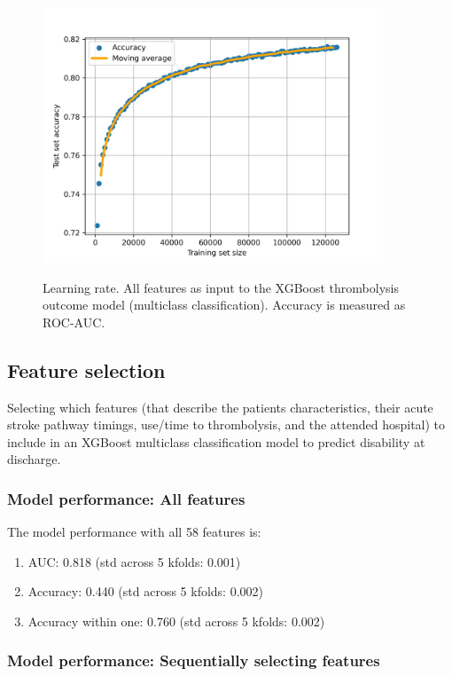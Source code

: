 \begin{figure}[h!]
    \centering
    {\includegraphics[width = 4in]{./images/015_xgb_all_features_learning_curve_learning_curve.jpg}}\\
    \caption{Learning rate. All features as input to the XGBoost thrombolysis outcome model (multiclass classification). Accuracy is measured as ROC-AUC.}
    \label{fig:learning_curve}
\end{figure}

\subsection{Feature selection}

Selecting which features (that describe the patients characteristics, their acute stroke pathway timings, use/time to thrombolysis, and the attended hospital) to include in an XGBoost multiclass classification model to predict disability at discharge.

\subsubsection{Model performance: All features}

The model performance with all 58 features is:
\begin{enumerate}
    \item AUC: 0.818 (std across 5 kfolds: 0.001)
    \item Accuracy: 0.440 (std across 5 kfolds: 0.002)
    \item Accuracy within one: 0.760 (std across 5 kfolds: 0.002)
\end{enumerate}

\subsubsection{Model performance: Sequentially selecting features}

